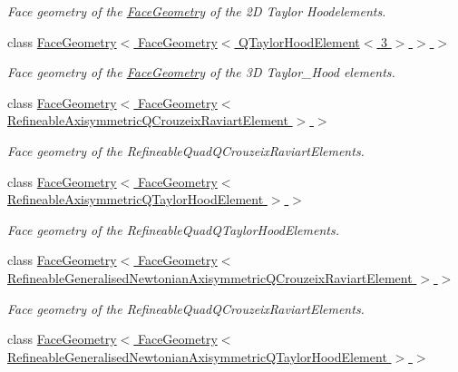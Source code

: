\begin{DoxyCompactItemize}
\begin{DoxyCompactList}\small\item\em Face geometry of the \hyperlink{classoomph_1_1FaceGeometry}{Face\+Geometry} of the 2D Taylor Hoodelements. \end{DoxyCompactList}\item 
class \hyperlink{classoomph_1_1FaceGeometry_3_01FaceGeometry_3_01QTaylorHoodElement_3_013_01_4_01_4_01_4}{Face\+Geometry$<$ Face\+Geometry$<$ Q\+Taylor\+Hood\+Element$<$ 3 $>$ $>$ $>$}
\begin{DoxyCompactList}\small\item\em Face geometry of the \hyperlink{classoomph_1_1FaceGeometry}{Face\+Geometry} of the 3D Taylor\+\_\+\+Hood elements. \end{DoxyCompactList}\item 
class \hyperlink{classoomph_1_1FaceGeometry_3_01FaceGeometry_3_01RefineableAxisymmetricQCrouzeixRaviartElement_01_4_01_4}{Face\+Geometry$<$ Face\+Geometry$<$ Refineable\+Axisymmetric\+Q\+Crouzeix\+Raviart\+Element $>$ $>$}
\begin{DoxyCompactList}\small\item\em Face geometry of the Refineable\+Quad\+Q\+Crouzeix\+Raviart\+Elements. \end{DoxyCompactList}\item 
class \hyperlink{classoomph_1_1FaceGeometry_3_01FaceGeometry_3_01RefineableAxisymmetricQTaylorHoodElement_01_4_01_4}{Face\+Geometry$<$ Face\+Geometry$<$ Refineable\+Axisymmetric\+Q\+Taylor\+Hood\+Element $>$ $>$}
\begin{DoxyCompactList}\small\item\em Face geometry of the Refineable\+Quad\+Q\+Taylor\+Hood\+Elements. \end{DoxyCompactList}\item 
class \hyperlink{classoomph_1_1FaceGeometry_3_01FaceGeometry_3_01RefineableGeneralisedNewtonianAxisymmetricQCrouzeixRaviartElement_01_4_01_4}{Face\+Geometry$<$ Face\+Geometry$<$ Refineable\+Generalised\+Newtonian\+Axisymmetric\+Q\+Crouzeix\+Raviart\+Element $>$ $>$}
\begin{DoxyCompactList}\small\item\em Face geometry of the Refineable\+Quad\+Q\+Crouzeix\+Raviart\+Elements. \end{DoxyCompactList}\item 
class \hyperlink{classoomph_1_1FaceGeometry_3_01FaceGeometry_3_01RefineableGeneralisedNewtonianAxisymmetricQTaylorHoodElement_01_4_01_4}{Face\+Geometry$<$ Face\+Geometry$<$ Refineable\+Generalised\+Newtonian\+Axisymmetric\+Q\+Taylor\+Hood\+Element $>$ $>$}

\end{DoxyCompactItemize}
